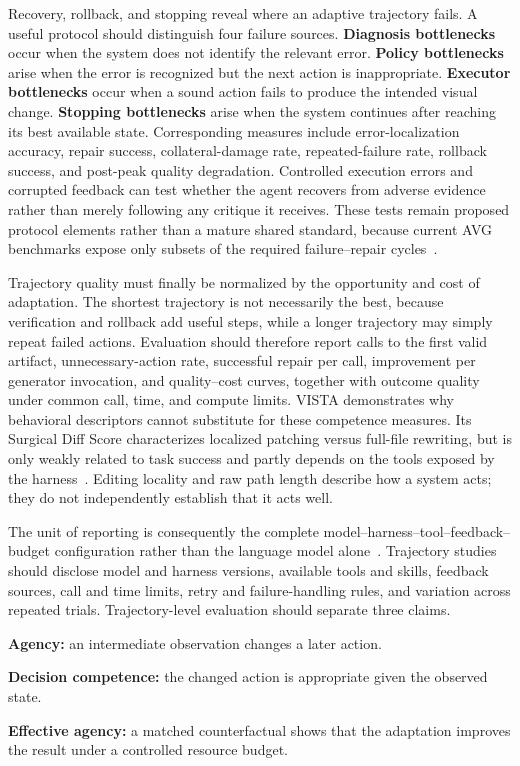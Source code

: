 Recovery, rollback, and stopping reveal where an adaptive trajectory fails. A useful protocol should distinguish four failure sources. \textbf{Diagnosis bottlenecks} occur when the system does not identify the relevant error. \textbf{Policy bottlenecks} arise when the error is recognized but the next action is inappropriate. \textbf{Executor bottlenecks} occur when a sound action fails to produce the intended visual change. \textbf{Stopping bottlenecks} arise when the system continues after reaching its best available state. Corresponding measures include error-localization accuracy, repair success, collateral-damage rate, repeated-failure rate, rollback success, and post-peak quality degradation. Controlled execution errors and corrupted feedback can test whether the agent recovers from adverse evidence rather than merely following any critique it receives. These tests remain proposed protocol elements rather than a mature shared standard, because current AVG benchmarks expose only subsets of the required failure--repair cycles~\cite{avg260601057,avg260526144,avg260608091}.

Trajectory quality must finally be normalized by the opportunity and cost of adaptation. The shortest trajectory is not necessarily the best, because verification and rollback add useful steps, while a longer trajectory may simply repeat failed actions. Evaluation should therefore report calls to the first valid artifact, unnecessary-action rate, successful repair per call, improvement per generator invocation, and quality--cost curves, together with outcome quality under common call, time, and compute limits. VISTA demonstrates why behavioral descriptors cannot substitute for these competence measures. Its Surgical Diff Score characterizes localized patching versus full-file rewriting, but is only weakly related to task success and partly depends on the tools exposed by the harness~\cite{avg260526144}. Editing locality and raw path length describe how a system acts; they do not independently establish that it acts well.

The unit of reporting is consequently the complete model--harness--tool--feedback--budget configuration rather than the language model alone~\cite{avg260605525,avg260526144}. Trajectory studies should disclose model and harness versions, available tools and skills, feedback sources, call and time limits, retry and failure-handling rules, and variation across repeated trials. Trajectory-level evaluation should separate three claims.

\begin{keytakeaway}
\begin{keypoints}
  \item \textbf{Agency:} an intermediate observation changes a later action.
  \item \textbf{Decision competence:} the changed action is appropriate given the observed state.
  \item \textbf{Effective agency:} a matched counterfactual shows that the adaptation improves the result under a controlled resource budget.
\end{keypoints}
\end{keytakeaway}


